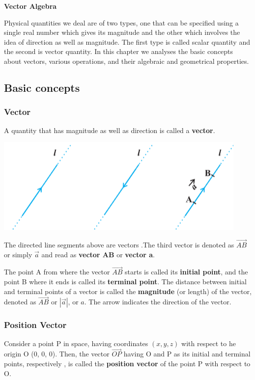 \documentclass[12pt]{article}
\begin{document}
\begin{center}
    {\LARGE \textbf{Vector Algebra} }
\end{center}

\begin{multicols*}{2}
    

Physical quantities we deal are of two types, one that can be specified using a single real number which gives its magnitude and the other which involves the idea of direction as well as magnitude. The first type is called scalar quantity and the second is vector quantity. In this chapter we analyses the basic concepts about vectors, various operations, and their algebraic and geometrical properties.

\subsection*{Basic concepts}
\subsubsection*{Vector}
A quantity that has magnitude as well as direction is called a \textbf{vector}.

\begin{center}
\includegraphics*[scale=0.5]{1.png}
\end{center}
The  directed line segments above are   vectors .The third vector is denoted as $\vec{AB}$ or simply $\vec{a}$ and read as \textbf{vector AB} or \textbf{vector a}.

The point A from where the vector $\vec{AB}$ starts is called its \textbf{initial point}, and the
point B where it ends is called its \textbf{terminal point}. The distance between initial and
terminal points of a vector is called the \textbf{magnitude} (or length) of the vector, denoted as $\vec{AB}$ or $|\vec{a}|$, or $a$. The arrow indicates the direction of the vector.

\subsubsection*{Position Vector}
Consider a point P in space, having coordinates $(x, y, z)$ with respect to he origin O (0, 0, 0). 
Then, the vector $\vec{OP}$ having O and P as its initial and terminal points, respectively
, is called the \textbf{position vector} of the point P with respect to O.


\end{multicols*}
\end{document}
